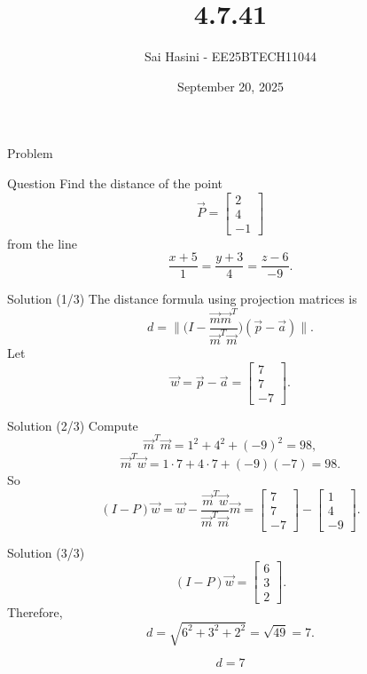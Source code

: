 \documentclass{beamer}
\title %
{4.7.41}
\date{September 20, 2025}
\author %
{Sai Hasini  - EE25BTECH11044}
\begin{document}
\begin{frame}{Problem}
\begin{block}{Question}
Find the distance of the point
\[
\vec{P} = \begin{bmatrix} 2 \\ 4 \\ -1 \end{bmatrix}
\]
from the line
\[
\frac{x+5}{1} = \frac{y+3}{4} = \frac{z-6}{-9}.
\]
\end{block}
\end{frame}
\begin{frame}{Solution (1/3)}
The distance formula using projection matrices is
\begin{equation}
d = \Big\|\Big(I-\frac{\vec m \vec m^T}{\vec m^T \vec m}\Big)(\vec p - \vec a)\Big\|.
\label{eq:dist-formula}
\end{equation}
Let
\begin{equation}
\vec w = \vec p - \vec a =
\begin{bmatrix}7\\7\\-7\end{bmatrix}.
\label{eq:w-def}
\end{equation}
\end{frame}

\begin{frame}{Solution (2/3)}
Compute
\begin{equation}
\vec m^T \vec m = 1^2+4^2+(-9)^2 = 98,
\label{eq:m-norm}
\end{equation}
\begin{equation}
\vec m^T \vec w = 1\cdot7 + 4\cdot7 + (-9)(-7) = 98.
\label{eq:m-w-dot}
\end{equation}
So
\begin{equation}
(I-P)\vec w = \vec w - \frac{\vec m^T \vec w}{\vec m^T \vec m}\vec m
= \begin{bmatrix}7\\7\\-7\end{bmatrix} -
\begin{bmatrix}1\\4\\-9\end{bmatrix}.
\label{eq:ipw}
\end{equation}
\end{frame}

\begin{frame}{Solution (3/3)}
\begin{equation}
(I-P)\vec w = \begin{bmatrix}6\\3\\2\end{bmatrix}.
\label{eq:ipw-result}
\end{equation}
Therefore,
\begin{equation}
d = \sqrt{6^2+3^2+2^2} = \sqrt{49} = 7.
\label{eq:final-d}
\end{equation}

\[
\boxed{d=7}
\]
\end{frame}
\end{document}
